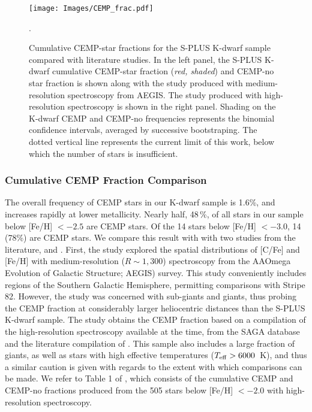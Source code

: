 \documentclass[twocolumn,trackchanges]{aastex63}
\begin{document}
\begin{figure*}
	\centering
	\texttt{[image: Images/CEMP\_frac.pdf]}
	
	\caption{Cumulative CEMP-star fractions for the S-PLUS K-dwarf sample compared with literature studies.  In the left panel, the S-PLUS K-dwarf cumulative CEMP-star fraction  (\textit{red, shaded}) and CEMP-no star fraction is shown along with the \citet{Yoon:2018:AEGIS} study produced with medium-resolution spectroscopy from AEGIS. The \citet{Placco:2014} study produced with high-resolution spectroscopy is shown in the right panel. Shading on the K-dwarf CEMP and CEMP-no frequencies represents the binomial confidence intervals, averaged by successive bootstraping. The dotted vertical line represents the current limit of this work, below which the number of stars is insufficient.\label{fig:CEMP_frac}}. 
\end{figure*}

\subsubsection{Cumulative CEMP Fraction Comparison}

The overall frequency of CEMP stars in our K-dwarf sample is 1.6\%, and increases rapidly at lower metallicity. Nearly half, 48\,\%, of all stars in our sample below [Fe/H] $ <-2.5$ are CEMP stars. Of the 14 stars below [Fe/H] $< -3.0$, 14 (78\%) are CEMP stars.
We compare this result with with two studies from the literature, \citet{Yoon:2018:AEGIS} and \citet{Placco:2014}. First, the \citet{Yoon:2018:AEGIS} study explored the spatial distributions of [C/Fe] and [Fe/H] with medium-resolution ($R \sim 1,300$) spectroscopy from the AAOmega Evolution of Galactic Structure; AEGIS) survey. This study conveniently includes regions of the Southern Galactic Hemisphere, permitting comparisons with Stripe 82. 
However, the \citet{Yoon:2018:AEGIS} study was concerned with sub-giants and giants, thus probing the CEMP fraction at considerably larger heliocentric distances than the S-PLUS K-dwarf sample.
The \citet{Placco:2014} study obtains the CEMP fraction based on a compilation of the high-resolution spectroscopy available at the time, from the SAGA database \citep{Suda:2008} and the literature compilation of \citet{Frebel:2010}. This sample also includes a large fraction of giants, as well as stars with high effective temperatures ($T_{\rm{eff}} > 6000$~K), and thus a similar caution is given with regards to the extent with which comparisons can be made. We refer to Table 1 of \citet{Placco:2014}, which consists of the cumulative CEMP and CEMP-no fractions produced from the 505 stars below [Fe/H] $ <-2.0$ with high-resolution spectroscopy.
\end{document}
